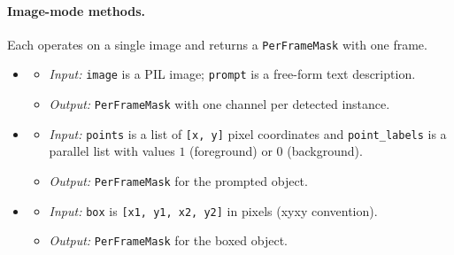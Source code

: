 \paragraph{Image-mode methods.} Each operates on a single image and returns a \texttt{PerFrameMask} with one frame.
\begin{itemize}[leftmargin=1.5em]
\item {}
  \begin{itemize}
  \item \emph{Input:} \texttt{image} is a PIL image; \texttt{prompt} is a free-form text description.
  \item \emph{Output:} \texttt{PerFrameMask} with one channel per detected instance.
  \end{itemize}
\item {}
  \begin{itemize}
  \item \emph{Input:} \texttt{points} is a list of \texttt{[x, y]} pixel coordinates and \texttt{point\_labels} is a parallel list with values $1$ (foreground) or $0$ (background).
  \item \emph{Output:} \texttt{PerFrameMask} for the prompted object.
  \end{itemize}
\item {}
  \begin{itemize}
  \item \emph{Input:} \texttt{box} is \texttt{[x1, y1, x2, y2]} in pixels (xyxy convention).
  \item \emph{Output:} \texttt{PerFrameMask} for the boxed object.
  \end{itemize}
\end{itemize}

